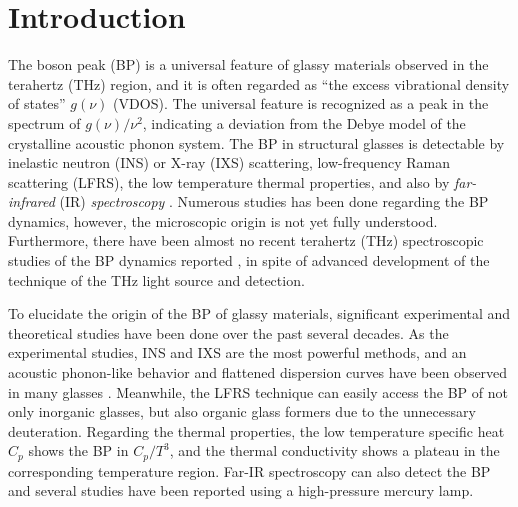 \documentclass[%
 reprint,
superscriptaddress,
 amsmath,amssymb,
 aps,
prb,
]{revtex4-1}
\begin{document}
\maketitle


\section{\label{sec:level1}Introduction}

The boson peak (BP) is a universal feature of glassy materials observed in the terahertz (THz) region, and it is often regarded as ``the excess vibrational density of states'' $g(\nu)$ (VDOS)\cite{Nakayama2002}.
The universal feature is recognized as a peak in the spectrum of $g(\nu)/\nu^{2}$, indicating a deviation from the Debye model of the crystalline acoustic phonon system.
The BP in structural glasses is detectable by inelastic neutron (INS) or X-ray (IXS) scattering, low-frequency Raman scattering (LFRS), the low temperature thermal properties, and  also by {\it far-infrared} (IR) {\it spectroscopy} \cite{Matsuishi1986, Hutt1989, Ohsaka1994, Ohsaka1998}.
Numerous studies has been done regarding the BP dynamics, however, the microscopic origin is not yet fully understood.
Furthermore, there have been almost no recent terahertz (THz) spectroscopic studies of the BP dynamics reported \cite{Naftaly2005, Taraskin2006, Shibata2015, Kojima2015, Sibik2016}, in spite of advanced development of the  technique of the THz light source and detection.

To elucidate the origin of the BP of glassy materials, significant experimental and theoretical studies have been done over the past several decades.
As the experimental studies, INS\cite{Buchenau1986, Yamamuro2000, Nakamura2001,  Orsingher2010PRB, Violini2012, Zanatta2013} and IXS\cite{Baldi2010, Baldi2011, Ruta2012} are the most powerful methods, and an acoustic phonon-like behavior and flattened dispersion curves have been observed in many glasses \cite{Nakamura2001, Orsingher2010PRB, Violini2012, Zanatta2013}.
Meanwhile, the LFRS technique can easily access the BP of not only inorganic glasses, but also organic glass formers due to the unnecessary deuteration\cite{Phillips1981, Nemanich1977, Malinovsky1986, Kojima1993, Surovtsev2002}.
Regarding the thermal properties, the low temperature specific heat $C_{p}$ \cite{Zeller1971, Phillips1981, Baldi2016, Carini2016} shows the BP in $C_{p}/T^{3}$, and the thermal conductivity shows a plateau in the corresponding temperature region\cite{Zeller1971, Phillips1981}.
Far-IR spectroscopy can also detect the BP and several studies have been reported using a high-pressure mercury lamp\cite{Hutt1989, Ohsaka1998, Matsuishi1986, Ohsaka1994}.
\end{document}
